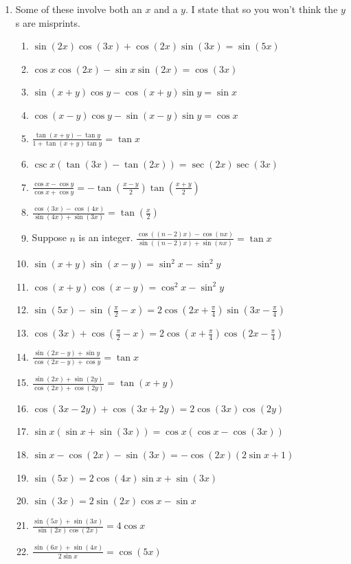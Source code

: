 \documentclass[english]{book}
\begin{document}
\begin{enumerate}
  \item Some of these involve both an $x$ and a $y$. I state that so you won't think the $y$s are misprints.
  \begin{enumerate}  %
    \item $\sin (2x) \cos (3x) + \cos (2x) \sin (3x) = \sin (5x)$
    \item $\cos x \cos (2x) - \sin x \sin (2x) = \cos (3x)$
    \item $\sin (x+y) \cos y - \cos (x+y) \sin y = \sin x$
    \item $\cos (x-y) \cos y - \sin (x-y) \sin y = \cos x$
    \item $\frac{ \tan (x+y) - \tan y }{ 1 + \tan (x+y) \tan y } = \tan x$
    \item $\csc x (\tan (3x) - \tan (2x) ) = \sec (2x) \sec (3x)$
    \item $\frac{\cos x -\cos y}{\cos x +\cos y} =-\tan (\frac{x-y}{2}) \tan(\frac{x+y}{2})$
    \item $\frac{\cos (3x) - \cos (4x)}{\sin (4x) + \sin (3x)} = \tan (\frac{x}{2})$
    \item Suppose $n$ is an integer. $\frac{\cos ((n-2)x) - \cos (nx)}{\sin ((n-2)x) + \sin (nx)} = \tan x$
    \item $\sin (x+y) \sin (x-y) = \sin^{2} x - \sin^{2} y$
    \item $\cos (x+y) \cos (x-y) = \cos^{2} x - \sin^{2} y$
    \item $\sin (5x) - \sin (\frac{\pi}{2}-x) = 2  \cos (2x+\frac{\pi}{4}) \sin (3x-\frac{\pi}{4})$
    \item $\cos (3x) + \cos(\frac{\pi}{2}-x) = 2  \cos (x+\frac{\pi}{4}) \cos (2x-\frac{\pi}{4})$
    \item $\frac{\sin (2x-y) + \sin y}{\cos (2x-y) + \cos y} = \tan x$
    \item $\frac{\sin (2x) + \sin (2y)}{\cos (2x) + \cos (2y)} = \tan (x+y)$
    \item $\cos (3x-2y) + \cos (3x+2y) = 2 \cos (3x) \cos (2y)$
    \item $\sin x (\sin x + \sin (3x) ) = \cos x (\cos x - \cos (3x) )$
    \item $\sin x - \cos (2x) - \sin (3x) = - \cos (2x) (2 \sin x + 1)$
    \item $\sin (5x) = 2 \cos (4x) \sin x + \sin (3x)$
    \item $\sin (3x) = 2 \sin (2x) \cos x - \sin x$
    \item $\frac{\sin (5x) + \sin (3x)}{\sin (2x) \cos (2x)} = 4 \cos x$
    \item $\frac{\sin (6x) + \sin (4x)}{2 \sin x} = \cos (5x)$

\end{enumerate}
\end{enumerate}
\end{document}

